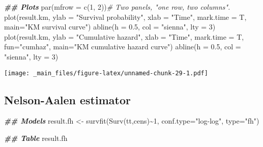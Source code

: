 \documentclass[
]{book}
\newenvironment{Shaded}{\begin{snugshade}}{\end{snugshade}}
\newcommand{\AttributeTok}[1]{\textcolor[rgb]{0.77,0.63,0.00}{#1}}
\newcommand{\CommentTok}[1]{\textcolor[rgb]{0.56,0.35,0.01}{\textit{#1}}}
\newcommand{\DecValTok}[1]{\textcolor[rgb]{0.00,0.00,0.81}{#1}}
\newcommand{\DocumentationTok}[1]{\textcolor[rgb]{0.56,0.35,0.01}{\textbf{\textit{#1}}}}
\newcommand{\FloatTok}[1]{\textcolor[rgb]{0.00,0.00,0.81}{#1}}
\newcommand{\FunctionTok}[1]{\textcolor[rgb]{0.00,0.00,0.00}{#1}}
\newcommand{\NormalTok}[1]{#1}
\newcommand{\OtherTok}[1]{\textcolor[rgb]{0.56,0.35,0.01}{#1}}
\newcommand{\SpecialCharTok}[1]{\textcolor[rgb]{0.00,0.00,0.00}{#1}}
\newcommand{\StringTok}[1]{\textcolor[rgb]{0.31,0.60,0.02}{#1}}
\begin{document}
\begin{Shaded}
\begin{Highlighting}[]
\DocumentationTok{\#\# Plots}
\FunctionTok{par}\NormalTok{(}\AttributeTok{mfrow =} \FunctionTok{c}\NormalTok{(}\DecValTok{1}\NormalTok{, }\DecValTok{2}\NormalTok{))}\CommentTok{\# Two panels, "one row, two columns".}
\FunctionTok{plot}\NormalTok{(result.km,}
     \AttributeTok{ylab =} \StringTok{"Survival probability"}\NormalTok{,}
     \AttributeTok{xlab =} \StringTok{"Time"}\NormalTok{,}
     \AttributeTok{mark.time =}\NormalTok{ T,}
     \AttributeTok{main=}\StringTok{"KM survival curve"}\NormalTok{)}
\FunctionTok{abline}\NormalTok{(}\AttributeTok{h =} \FloatTok{0.5}\NormalTok{, }\AttributeTok{col =} \StringTok{"sienna"}\NormalTok{, }\AttributeTok{lty =} \DecValTok{3}\NormalTok{)}
\FunctionTok{plot}\NormalTok{(result.km,}
     \AttributeTok{ylab =} \StringTok{"Cumulative hazard"}\NormalTok{,}
     \AttributeTok{xlab =} \StringTok{"Time"}\NormalTok{,}
     \AttributeTok{mark.time =}\NormalTok{ T,}
     \AttributeTok{fun=}\StringTok{"cumhaz"}\NormalTok{,}
     \AttributeTok{main=}\StringTok{"KM cumulative hazard curve"}\NormalTok{)}
\FunctionTok{abline}\NormalTok{(}\AttributeTok{h =} \FloatTok{0.5}\NormalTok{, }\AttributeTok{col =} \StringTok{"sienna"}\NormalTok{, }\AttributeTok{lty =} \DecValTok{3}\NormalTok{)}
\end{Highlighting}
\end{Shaded}

\texttt{[image: \_main\_files/figure-latex/unnamed-chunk-29-1.pdf]}

\hypertarget{nelson-aalen-estimator}{%
\subsection{Nelson-Aalen estimator}\label{nelson-aalen-estimator}}

\begin{Shaded}
\begin{Highlighting}[]
\DocumentationTok{\#\# Models}
\NormalTok{result.fh }\OtherTok{\textless{}{-}} \FunctionTok{survfit}\NormalTok{(}\FunctionTok{Surv}\NormalTok{(tt,cens)}\SpecialCharTok{\textasciitilde{}}\DecValTok{1}\NormalTok{, }\AttributeTok{conf.type=}\StringTok{"log{-}log"}\NormalTok{, }\AttributeTok{type=}\StringTok{"fh"}\NormalTok{)}

\DocumentationTok{\#\# Table}
\NormalTok{result.fh}
\end{Highlighting}
\end{Shaded}
\end{document}
